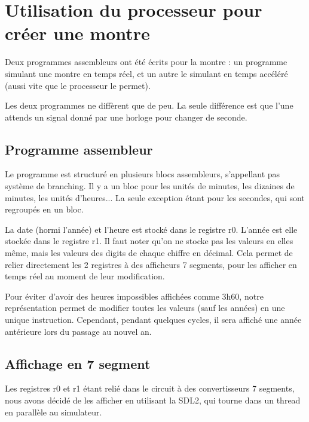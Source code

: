 \documentclass[a4paper]{article}
\begin{document}
\section{Utilisation du processeur pour créer une montre}

Deux programmes assembleurs ont été écrits pour la montre : un programme
simulant une montre en temps réel, et un autre le simulant en temps accéléré
(aussi vite que le processeur le permet).

Les deux programmes ne diffèrent que de peu. La seule différence est que l'une
attends un signal donné par une horloge pour changer de seconde.

\subsection{Programme assembleur}


Le programme est structuré en plusieurs blocs assembleurs, s'appellant pas
système de branching. Il y a un bloc pour les unités de minutes, les dizaines de
minutes, les unités d'heures... La seule exception étant pour les secondes, qui
sont regroupés en un bloc.

La date (hormi l'année) et l'heure est stocké dans le registre r0. L'année est
elle stockée dans le registre r1. Il faut noter qu'on ne stocke pas les valeurs
en elles même, mais les valeurs des digits de chaque chiffre en décimal. Cela
permet de relier directement les 2 registres à des afficheurs 7 segments, pour
les afficher en temps réel au moment de leur modification.

Pour éviter d'avoir des heures impossibles affichées comme 3h60, notre
représentation permet de modifier toutes les valeurs (sauf les années) en une
unique instruction. Cependant, pendant quelques cycles, il sera affiché une
année antérieure lors du passage au nouvel an.



\subsection{Affichage en 7 segment}

Les registres r0 et r1 étant relié dans le circuit à des convertisseurs 7
segments, nous avons décidé de les afficher en utilisant la SDL2, qui tourne
dans un thread en parallèle au simulateur.
\end{document}
